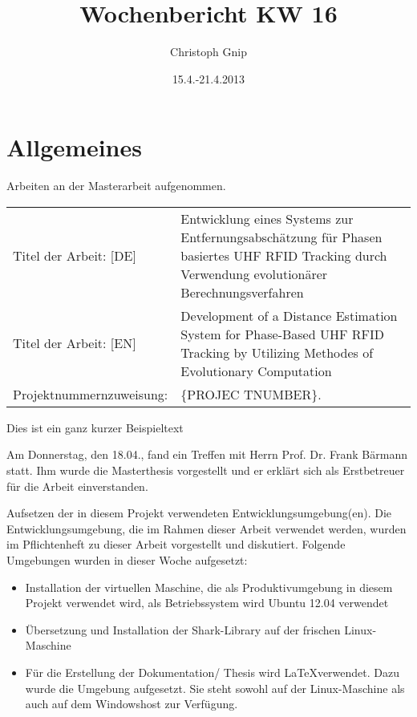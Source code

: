 ﻿\documentclass[a4paper,12pt,fleqn]{scrartcl}
\title{Wochenbericht KW 16}
\author{Christoph Gnip}
\date{ 15.4.-21.4.2013 }
\begin{document}
\maketitle



\section[Allgemeines]{Allgemeines}

Arbeiten an der Masterarbeit aufgenommen.

\begin{table}[right]
    \begin{tabular}{lp{10cm}}
      Titel der Arbeit:  [DE]&
      Entwicklung eines Systems zur Entfernungsabschätzung für Phasen basiertes
      UHF RFID Tracking durch Verwendung evolutionärer Berechnungsverfahren \\
      Titel der Arbeit:  [EN]&
      Development of a Distance Estimation System for Phase-Based UHF RFID
      Tracking  by Utilizing Methodes of Evolutionary Computation \\
      Projektnummernzuweisung: & \{PROJEC TNUMBER\}.\\

    \end{tabular}%
\end{table}%



Dies ist ein ganz kurzer Beispieltext

Am Donnerstag, den 18.04., fand ein Treffen mit Herrn Prof.
Dr. Frank Bärmann statt. Ihm wurde die Masterthesis vorgestellt und er erklärt
sich als Erstbetreuer für die Arbeit einverstanden.

Aufsetzen der in diesem Projekt verwendeten Entwicklungsumgebung(en). Die
Entwicklungsumgebung, die im Rahmen dieser Arbeit
verwendet werden, wurden im
Pflichtenheft zu dieser Arbeit vorgestellt und diskutiert.
\newline
Folgende Umgebungen wurden in dieser Woche aufgesetzt:
\begin{itemize}
 \item Installation der virtuellen Maschine, die als Produktivumgebung in
diesem Projekt verwendet wird, als Betriebssystem wird Ubuntu 12.04 verwendet
 \item Übersetzung und Installation der Shark-Library auf der frischen
Linux-Maschine
 \item Für die Erstellung der Dokumentation/ Thesis wird \LaTeX verwendet.
Dazu wurde die Umgebung aufgesetzt. Sie steht sowohl auf der Linux-Maschine als
auch auf dem Windowshost zur Verfügung.
\end{itemize}
\end{document}
